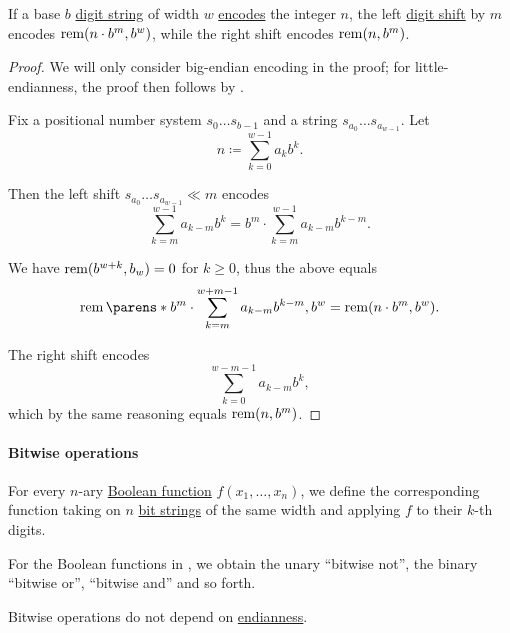 \begin{proposition}\label{thm:digit_shift_arithmetic}
  If a base \( b \) \hyperref[def:positional_number_system]{digit string} of width \( w \) \hyperref[def:ring_of_unsigned_integers]{encodes} the integer \( n \), the left \hyperref[def:digit_shift]{digit shift} by \( m \) encodes \( \operatorname{rem}(n \cdot b^m, b^w) \), while the right shift encodes \( \operatorname{rem}(n, b^m) \).
\end{proposition}
\begin{proof}
  We will only consider big-endian encoding in the proof; for little-endianness, the proof then follows by .

  Fix a positional number system \( s_0 \ldots s_{b-1} \) and a string \( s_{a_0} \ldots s_{a_{w-1}} \). Let
  \begin{equation*}
    n \coloneqq \sum_{k=0}^{w-1} a_k b^k.
  \end{equation*}

  Then the left shift \( s_{a_0} \ldots s_{a_{w-1}} \ll m \) encodes
  \begin{equation*}
    \sum_{k=m}^{w-1} a_{k-m} b^k = b^m \cdot \sum_{k=m}^{w-1} a_{k-m} b^{k-m}.
  \end{equation*}

  We have \( \operatorname{rem}(b^{w+k}, b_w) = 0 \) for \( k \geq 0 \), thus the above equals
  \begin{equation*}
    \rem\parens*{ b^m \cdot \sum_{k=m}^{w+m-1} a_{k-m} b^{k-m}, b^w } = \rem(n \cdot b^m, b^w).
  \end{equation*}

  The right shift encodes
  \begin{equation*}
    \sum_{k=0}^{w-m-1} a_{k-m} b^k,
  \end{equation*}
  which by the same reasoning equals \( \operatorname{rem}(n, b^m) \).
\end{proof}

\paragraph{Bitwise operations}

\begin{definition}\label{def:bitwise_operations}
  For every \( n \)-ary \hyperref[def:boolean_function]{Boolean function} \( f(x_1, \ldots, x_n) \), we define the corresponding  function taking on \( n \) \hyperref[def:bit_string]{bit strings} of the same width and applying \( f \) to their \( k \)-th digits.
\end{definition}
\begin{comments}
  \item For the Boolean functions in , we obtain the unary \enquote{bitwise not}, the binary \enquote{bitwise or}, \enquote{bitwise and} and so forth.

  \item Bitwise operations do not depend on \hyperref[def:endianness]{endianness}.
\end{comments}

